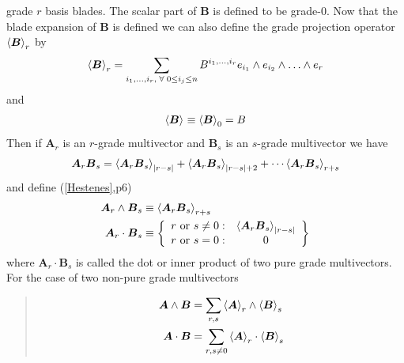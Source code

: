 \documentclass[letterpaper,10pt,english]{sphinxmanual}
\begin{document}
grade $r$ basis blades. The scalar part of $\bm{B}$ is defined to
be grade-$0$.  Now that the blade expansion of $\bm{B}$ is defined
we can also define the grade projection operator $\left < {\boldsymbol{B}} \right >_{r}$ by
\begin{gather}
\begin{split}\begin{equation*}
   \proj{\bm{B}}{r} = \sum_{i_{1},\dots,i_{r},\;\forall\; 0\le i_{j} \le n} B^{i_{1},\dots,i_{r}}e_{i_{1}}\W e_{i_{2}}\W\dots\W e_{r}
\end{equation*}\end{split}\notag
\end{gather}
and
\begin{gather}
\begin{split}\begin{equation*}
   \left < {\boldsymbol{B}} \right >_{} \equiv \left < {\boldsymbol{B}} \right >_{0} = B
\end{equation*}\end{split}\notag
\end{gather}
Then if $\bm{A}_{r}$ is an $r$-grade multivector and $\bm{B}_{s}$ is an $s$-grade multivector we have
\begin{gather}
\begin{split}\begin{equation*}
   \boldsymbol{A}_{r}\boldsymbol{B}_{s} = \left < {\boldsymbol{A}_{r}\boldsymbol{B}_{s}} \right >_{\left |{r-s}\right |}+\left < {\boldsymbol{A}_{r}\boldsymbol{B}_{s}} \right >_{\left |{r-s}\right |+2}+\cdots
                          \left < {\boldsymbol{A}_{r}\boldsymbol{B}_{s}} \right >_{r+s}
\end{equation*}\end{split}\notag
\end{gather}
and define ({\hyperref[GA:hestenes]{{[}Hestenes{]}}},p6)
\begin{gather}
\begin{split}\begin{align*}
   \boldsymbol{A}_{r}\wedge\boldsymbol{B}_{s} &\equiv \left < {\boldsymbol{A}_{r}\boldsymbol{B}_{s}} \right >_{r+s} \\
   \boldsymbol{A}_{r}\cdot\boldsymbol{B}_{s} &\equiv \left \{ { \begin{array}{cc}
   r\mbox{ or }s \ne 0: & \left < {\boldsymbol{A}_{r}\boldsymbol{B}_{s}} \right >_{\left |{r-s}\right |}  \\
   r\mbox{ or }s = 0: & 0 \end{array}} \right \}
\end{align*}\end{split}\notag
\end{gather}
where $\bm{A}_{r}\cdot\bm{B}_{s}$ is called the dot or inner product of
two pure grade multivectors.  For the case of two non-pure grade multivectors
\begin{quote}
\begin{gather}
\begin{split}\begin{align*}
   \boldsymbol{A}\wedge\boldsymbol{B} &= \sum_{r,s}\left < {\boldsymbol{A}} \right >_{r}\wedge\left < {\boldsymbol{B}} \right >_{{s}} \\
   \boldsymbol{A}\cdot\boldsymbol{B} &= \sum_{r,s\ne 0}\left < {\boldsymbol{A}} \right >_{r}\cdot\left < {\boldsymbol{B}} \right >_{{s}}
\end{align*}\end{split}\notag
\end{gather}\end{quote}
\end{document}
